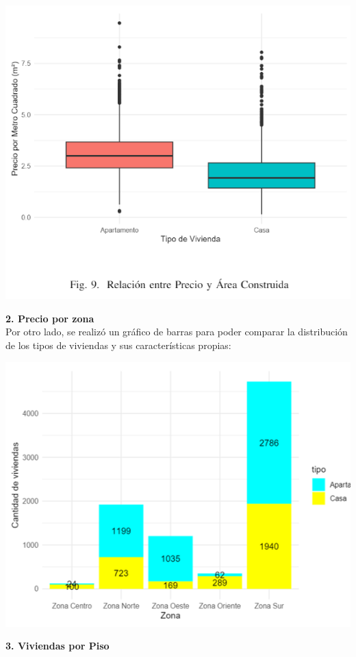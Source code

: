 \documentclass[conference,final,]{IEEEtran}
\begin{document}
\includegraphics[width=1\linewidth]{images/BoxplotPreciosArea}

\textbf{2. Precio por zona}\\
Por otro lado, se realizó un gráfico de barras para poder comparar la
distribución de los tipos de viviendas y sus características propias:

\includegraphics[width=1\linewidth]{images/PrecioPorZona}

\textbf{3. Viviendas por Piso}\\
\end{document}
